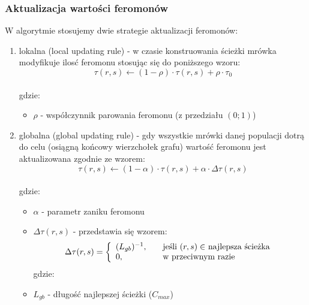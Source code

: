 \documentclass[10pt,a4paper]{article}
\begin{document}
\vspace{15mm}
\subsubsection{Aktualizacja wartości feromonów}
W algorytmie stosujemy dwie strategie aktualizacji feromonów: \\
\begin{enumerate}
  \item lokalna (local updating rule) - w czasie konstruowania ścieżki mrówka
    modyfikuje ilosć feromonu stosując się do poniższego wzoru:\\
  \begin{equation} \tau (r,s) \leftarrow (1 - \rho) \cdot \tau (r,s) + \rho \cdot \tau_0  \end{equation} \\
  gdzie:
  \begin{itemize}
  \item $ \rho $ - współczynnik parowania feromonu (z przedziału $ (0;1) $)
\end{itemize}

  \item globalna (global updating rule) - gdy wszystkie mrówki danej populacji
    dotrą do celu (osiągną końcowy wierzchołek grafu) wartość feromonu jest
    aktualizowana zgodnie ze wzorem:\\
   \begin{equation} \tau (r,s) \leftarrow (1 - \alpha) \cdot \tau (r,s) + \alpha \cdot \Delta \tau (r,s)  \end{equation} \\
  gdzie:
  \begin{itemize}
  \item $ \alpha $ - parametr zaniku feromonu
  \item $ \Delta \tau (r,s) $ - przedstawia się wzorem: \\
  \begin{equation}
 \Delta \tau (r,s) = \left\{ 
  \begin{array}{l l}
    (L_{gb})^{-1} , & \quad \text{jeśli $(r,s) \in$ najlepsza ścieżka}\\
    0, & \quad \text{w przeciwnym razie}
  \end{array} \right.
\end{equation}
  gdzie:
  \item $ L_{gb}$ - długość najlepszej ścieżki ($C_{max}$)
\end{itemize}
\end{enumerate}
\end{document}
